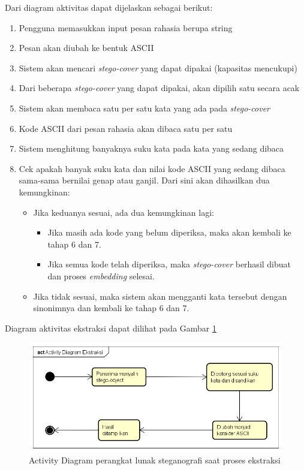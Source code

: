 Dari diagram aktivitas dapat dijelaskan sebagai berikut:

\begin{enumerate}
	\item Pengguna memasukkan input pesan rahasia berupa string
	\item Pesan akan diubah ke bentuk ASCII
	\item Sistem akan mencari \textit{stego-cover} yang dapat dipakai (kapasitas mencukupi)
	\item Dari beberapa \textit{stego-cover} yang dapat dipakai, akan dipilih satu secara acak
	\item Sistem akan membaca satu per satu kata yang ada pada \textit{stego-cover}
	\item Kode ASCII dari pesan rahasia akan dibaca satu per satu
	\item Sistem menghitung banyaknya suku kata pada kata yang sedang dibaca
	\item Cek apakah banyak suku kata dan nilai kode ASCII yang sedang dibaca sama-sama bernilai genap atau ganjil. Dari sini akan dihasilkan dua kemungkinan:
	\begin{itemize}
		\item Jika keduanya sesuai, ada dua kemungkinan lagi:
		\begin{itemize}
			\item Jika masih ada kode yang belum diperiksa, maka akan kembali ke tahap 6 dan 7.
			\item Jika semua kode telah diperiksa, maka \textit{stego-cover} berhasil dibuat dan proses \textit{embedding} selesai.
		\end{itemize}
		\item Jika tidak sesuai, maka sistem akan mengganti kata tersebut dengan sinonimnya dan kembali ke tahap 6 dan 7.
	\end{itemize}
\end{enumerate}

Diagram aktivitas ekstraksi dapat dilihat pada Gambar \ref{fig:4_activity-ekstraksi}

\begin{figure}[H]
	\centering
	\includegraphics[scale=0.5]{Gambar/activity-ekstraksi}
	\caption{Activity Diagram perangkat lunak steganografi saat proses ekstraksi} 
	\label{fig:4_activity-ekstraksi}
\end{figure}

